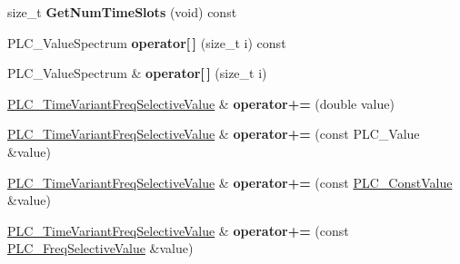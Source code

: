 \begin{DoxyCompactItemize}
\item 
\hypertarget{classns3_1_1PLC__TimeVariantFreqSelectiveValue_af9450d35002eabdb86ff3540f0734c9a}{size\-\_\-t {\bfseries \-Get\-Num\-Time\-Slots} (void) const }\label{classns3_1_1PLC__TimeVariantFreqSelectiveValue_af9450d35002eabdb86ff3540f0734c9a}

\item 
\hypertarget{classns3_1_1PLC__TimeVariantFreqSelectiveValue_a67a1c2bcf6806f9b94c12b0d332e0c3c}{\-P\-L\-C\-\_\-\-Value\-Spectrum {\bfseries operator\mbox{[}$\,$\mbox{]}} (size\-\_\-t i) const }\label{classns3_1_1PLC__TimeVariantFreqSelectiveValue_a67a1c2bcf6806f9b94c12b0d332e0c3c}

\item 
\hypertarget{classns3_1_1PLC__TimeVariantFreqSelectiveValue_ab9a1175c8165dd6bbd3441172ed25317}{\-P\-L\-C\-\_\-\-Value\-Spectrum \& {\bfseries operator\mbox{[}$\,$\mbox{]}} (size\-\_\-t i)}\label{classns3_1_1PLC__TimeVariantFreqSelectiveValue_ab9a1175c8165dd6bbd3441172ed25317}

\item 
\hypertarget{classns3_1_1PLC__TimeVariantFreqSelectiveValue_a9a5278262de8119f8e63720bdb86b8a2}{\hyperlink{classns3_1_1PLC__TimeVariantFreqSelectiveValue}{\-P\-L\-C\-\_\-\-Time\-Variant\-Freq\-Selective\-Value} \& {\bfseries operator+=} (double value)}\label{classns3_1_1PLC__TimeVariantFreqSelectiveValue_a9a5278262de8119f8e63720bdb86b8a2}

\item 
\hypertarget{classns3_1_1PLC__TimeVariantFreqSelectiveValue_af12e5ec4ae40d7d2af43d472fc39e499}{\hyperlink{classns3_1_1PLC__TimeVariantFreqSelectiveValue}{\-P\-L\-C\-\_\-\-Time\-Variant\-Freq\-Selective\-Value} \& {\bfseries operator+=} (const \-P\-L\-C\-\_\-\-Value \&value)}\label{classns3_1_1PLC__TimeVariantFreqSelectiveValue_af12e5ec4ae40d7d2af43d472fc39e499}

\item 
\hypertarget{classns3_1_1PLC__TimeVariantFreqSelectiveValue_a5248179b5dc92213e7bbf4cc576d8634}{\hyperlink{classns3_1_1PLC__TimeVariantFreqSelectiveValue}{\-P\-L\-C\-\_\-\-Time\-Variant\-Freq\-Selective\-Value} \& {\bfseries operator+=} (const \hyperlink{classns3_1_1PLC__ConstValue}{\-P\-L\-C\-\_\-\-Const\-Value} \&value)}\label{classns3_1_1PLC__TimeVariantFreqSelectiveValue_a5248179b5dc92213e7bbf4cc576d8634}

\item 
\hypertarget{classns3_1_1PLC__TimeVariantFreqSelectiveValue_a5d7dfdd42b5bf0b78e60282395763c9e}{\hyperlink{classns3_1_1PLC__TimeVariantFreqSelectiveValue}{\-P\-L\-C\-\_\-\-Time\-Variant\-Freq\-Selective\-Value} \& {\bfseries operator+=} (const \hyperlink{classns3_1_1PLC__FreqSelectiveValue}{\-P\-L\-C\-\_\-\-Freq\-Selective\-Value} \&value)}\label{classns3_1_1PLC__TimeVariantFreqSelectiveValue_a5d7dfdd42b5bf0b78e60282395763c9e}


\end{DoxyCompactItemize}
